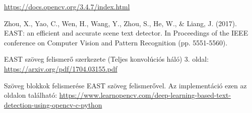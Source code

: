 \documentclass[a4paper,12pt]{article}
\begin{document}
\begin{thebibliography}{9}
\url{https://docs.opencv.org/3.4.7/index.html}

Zhou, X., Yao, C., Wen, H., Wang, Y., Zhou, S., He, W., & Liang, J. (2017). EAST: an efficient and accurate scene text detector. In Proceedings of the IEEE conference on Computer Vision and Pattern Recognition (pp. 5551-5560).

EAST szöveg felismerő szerkezete (Teljes konvolúciós háló) 3. oldal: \url{https://arxiv.org/pdf/1704.03155.pdf}

Szöveg blokkok felismerése EAST szöveg felismerővel. Az implementáció ezen az oldalon található:  \url{https://www.learnopencv.com/deep-learning-based-text-detection-using-opencv-c-python}

\end{thebibliography}
\end{document}
